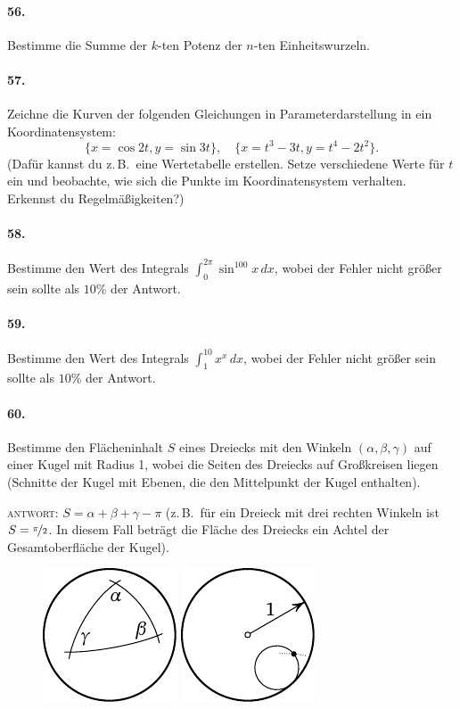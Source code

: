 \documentclass[10pt,a5paper,twoside]{article}
\newenvironment{problem}[1]{\paragraph*{#1}}{}
\begin{document}
\begin{problem}{56.}
	Bestimme die Summe der $k$-ten Potenz der $n$-ten Einheitswurzeln.
\end{problem}

\begin{problem}{57.}
	Zeichne die Kurven der folgenden Gleichungen in Parameterdarstellung in ein Koordinatensystem: 
	\begin{equation*}
	\{x=\cos 2t, y=\sin 3t\},\quad 
	\{x=t^3-3t, y=t^4-2t^2\}.
	\end{equation*}
	(Dafür kannst du z.\,B.\ eine Wertetabelle erstellen. Setze verschiedene Werte für $t$ ein und beobachte, wie sich die Punkte im Koordinatensystem verhalten. Erkennst du Regelmäßigkeiten?)
\end{problem}

\begin{problem}{58.}
	Bestimme den Wert des Integrals $\int_0^{2\pi} \sin^{100} x\,dx$, wobei der Fehler nicht größer sein sollte als $10\%$ der Antwort.
\end{problem}

\begin{problem}{59.}
	Bestimme den Wert des Integrals $\int_1^{10} x^x\,dx$, wobei der Fehler nicht größer sein sollte als $10\%$ der Antwort.
\end{problem}

\begin{problem}{60.}
	Bestimme den Flächeninhalt $S$ eines Dreiecks mit den Winkeln $(\alpha, \beta, \gamma)$ auf einer Kugel mit Radius 1, wobei die Seiten des Dreiecks auf Großkreisen liegen (Schnitte der Kugel mit Ebenen, die den Mittelpunkt der Kugel enthalten).

	\noindent\textsc{antwort:} $S=\alpha+\beta+\gamma-\pi$ (z.\,B.\ für ein Dreieck mit drei rechten Winkeln ist $S=\nicefrac{\pi}{2}$. In diesem Fall beträgt die Fläche des Dreiecks ein Achtel der Gesamtoberfläche der Kugel).
	\begin{figure}[H]
	\null\hfill
	\includegraphics{taskbook-44}
	\hfill
	\includegraphics{taskbook-45}
	\hfill\null
	\end{figure}
\end{problem}
\end{document}
